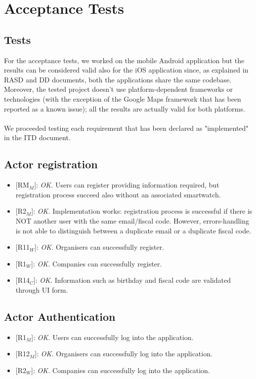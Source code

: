 \documentclass{article}
\begin{document}
\newpage
\section{Acceptance Tests}
\subsection{Tests}

For the acceptance tests, we worked on the mobile Android application but the results can be considered valid also for the iOS application  since, as explained  in RASD and DD documents, both the applications share the same codebase. Moreover, the tested project doesn't use platform-dependent frameworks or technologies (with the exception of the Google Maps framework that has been reported as a known issue); all the results are actually valid for both platforms.\\\\
We proceeded testing each requirement that has been declared as "implemented" in the ITD document.

\subsection{Actor registration}
\begin{itemize}
	\item {[RM$_M$]}: \textit{OK.} Users can register providing information required, but registration process succeed also without an associated smartwatch.
	\item {[R2$_M$]}: \textit{OK.} Implementation works: registration process is successful if  there is NOT another user with the same email/fiscal code. However, errors-handling is not able to distinguish between a duplicate email or a duplicate fiscal code.
	\item {[R11$_W$]}: \textit{OK.} Organisers can successfully register.
	\item {[R1$_W$]}: \textit{OK.} Companies can successfully register.
	\item {[R14$_C$]}: \textit{OK.} Information such as birthday and fiscal code are validated through UI form.
\end{itemize}

\subsection{Actor Authentication} 
\begin{itemize}
	\item {[R1$_M$]}: \textit{OK.} Users can successfully log into the application.
	\item {[R12$_M$]}: \textit{OK.} Organisers can successfully log into the application.
	\item {[R2$_W$]}: \textit{OK.} Companies  can successfully log into the application.
\end{itemize}
\end{document}
